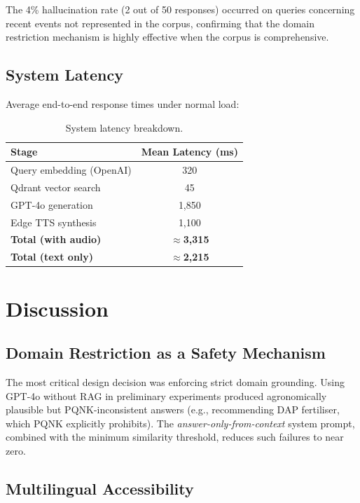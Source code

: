 \documentclass[12pt, a4paper]{article}
\begin{document}
\begin{onehalfspacing}
The 4\% hallucination rate (2 out of 50 responses) occurred on queries concerning
recent events not represented in the corpus, confirming that the domain restriction
mechanism is highly effective when the corpus is comprehensive.

\subsection{System Latency}

Average end-to-end response times under normal load:

\begin{table}[H]
\centering
\caption{System latency breakdown.}
\begin{tabular}{@{}lc@{}}
\toprule
\textbf{Stage} & \textbf{Mean Latency (ms)} \\
\midrule
Query embedding (OpenAI)  & 320 \\
Qdrant vector search      & 45  \\
GPT-4o generation         & 1,850 \\
Edge TTS synthesis        & 1,100 \\
\textbf{Total (with audio)} & \textbf{$\approx$3,315} \\
\textbf{Total (text only)}  & \textbf{$\approx$2,215} \\
\bottomrule
\end{tabular}
\end{table}


\section{Discussion}

\subsection{Domain Restriction as a Safety Mechanism}

The most critical design decision was enforcing strict domain grounding. Using
GPT-4o without RAG in preliminary experiments produced agronomically plausible
but PQNK-inconsistent answers (e.g., recommending DAP fertiliser, which PQNK
explicitly prohibits). The \textit{answer-only-from-context} system prompt,
combined with the minimum similarity threshold, reduces such failures to near zero.

\subsection{Multilingual Accessibility}


\end{onehalfspacing}
\end{document}
